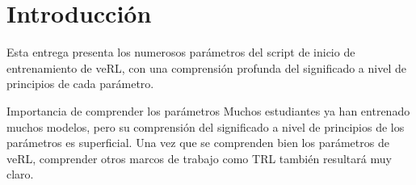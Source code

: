 \section{Introducción}
Esta entrega presenta los numerosos parámetros del script de inicio de entrenamiento de veRL, con una comprensión profunda del significado a nivel de principios de cada parámetro.

\begin{importantbox}{Importancia de comprender los parámetros}
Muchos estudiantes ya han entrenado muchos modelos, pero su comprensión del significado a nivel de principios de los parámetros es superficial. Una vez que se comprenden bien los parámetros de veRL, comprender otros marcos de trabajo como TRL también resultará muy claro.
\end{importantbox}
